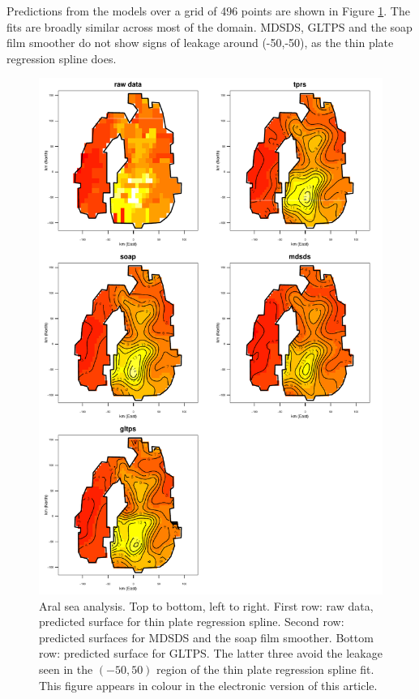 \documentclass[useAMS, referee]{biom}
\begin{document}
Predictions from the models over a grid of 496 points are shown in Figure \ref{aral-plot}. The fits are broadly similar across most of the domain. MDSDS, GLTPS and the soap film smoother do not show signs of leakage around (-50,-50), as the thin plate regression spline does.



\begin{figure}
\centering
\includegraphics[height=0.8\textheight]{examples/aral/aral-plot.pdf}
\caption{Aral sea analysis. Top to bottom, left to right. First row: raw data, predicted surface for thin plate regression spline. Second row: predicted surfaces for MDSDS and the soap film smoother. Bottom row: predicted surface for GLTPS. The latter three avoid the leakage seen in the $(-50, 50)$ region of the thin plate regression spline fit. This figure appears in colour in the electronic version of this article.}
\label{aral-plot}
\end{figure}
\end{document}
